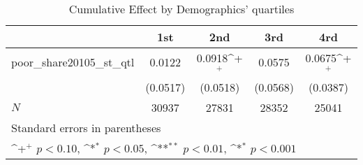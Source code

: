 \begin{table}[htbp]\centering
\def\sym#1{\ifmmode^{#1}\else\(^{#1}\)\fi}
\caption{Cumulative Effect by Demographics' quartiles}
\begin{tabular}{l*{4}{c}}
\hline\hline
            &\multicolumn{1}{c}{1st}&\multicolumn{1}{c}{2nd}&\multicolumn{1}{c}{3rd}&\multicolumn{1}{c}{4rd}\\
\hline
poor\_share20105\_st\_qtl&      0.0122       &      0.0918\sym{+}&      0.0575       &      0.0675\sym{+}\\
            &    (0.0517)       &    (0.0518)       &    (0.0568)       &    (0.0387)       \\
\hline
\(N\)       &       30937       &       27831       &       28352       &       25041       \\
\hline\hline
\multicolumn{5}{l}{\footnotesize Standard errors in parentheses}\\
\multicolumn{5}{l}{\footnotesize \sym{+} \(p<0.10\), \sym{*} \(p<0.05\), \sym{**} \(p<0.01\), \sym{*} \(p<0.001\)}\\
\end{tabular}
\end{table}
